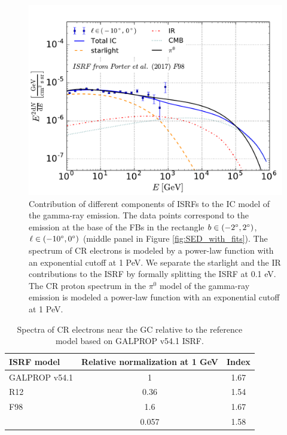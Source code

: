 \begin{figure}[h]
\includegraphics[width=\twopic\textwidth]{plots/SED_ISRF_componentsboxes_source_0_F98}
\caption{Contribution of different components of ISRFs to the IC model of the gamma-ray emission.
The data points correspond to the emission at the base of the FBs in the rectangle $b \in (-2^\circ, 2^\circ)$, $\ell \in (-10^\circ, 0^\circ)$
(middle panel in Figure \ref{fig:SED_with_fits}).
The spectrum of CR electrons is modeled by a power-law function with an exponential  cutoff at 1 PeV.
We separate the starlight and the IR contributions to the ISRF by formally splitting the ISRF at 0.1 eV.
The CR proton spectrum in the $\pi^0$ model of the gamma-ray emission
is modeled a power-law function with an exponential cutoff at 1 PeV.}
\label{fig:GC_CR}
\end{figure}

\begin{table}
  \begin{center}
    \caption{\label{tab:CRe_syst} 
Spectra of CR electrons near the GC relative to the reference model based on GALPROP v54.1 ISRF.
}
    \begin{tabular}{| l |c|c|} %
     	\hline
		 ISRF model & Relative normalization at 1 GeV  & Index \\
		\hline
  		GALPROP v54.1 & 1 & 1.67 \\ 
  		\cite{2017ApJ...846...67P} R12 & 0.36 & 1.54 \\ 
  		\cite{2017ApJ...846...67P} F98 & 1.6 & 1.67 \\ 
  		\cite{2017MNRAS.470.2539P} & 0.057 & 1.58 \\ 
 \hline
    \end{tabular}
  \end{center}
\end{table}



